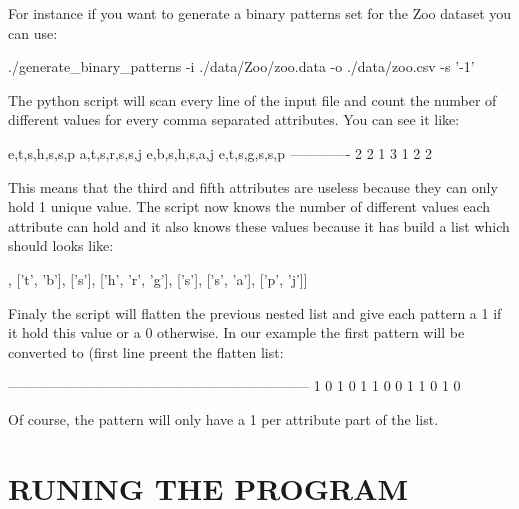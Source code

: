 For instance if you want to generate a binary patterns set for the Zoo dataset you can use\-: 
\begin{DoxyCode}
./generate\_binary\_patterns -i ./data/Zoo/zoo.data -o ./data/zoo.csv -s \textcolor{stringliteral}{'-1'}
\end{DoxyCode}


The python script will scan every line of the input file and count the number of different values for every comma separated attributes. You can see it like\-: 
\begin{DoxyCode}
e,t,s,h,s,s,p
a,t,s,r,s,s,j
e,b,s,h,s,a,j
e,t,s,g,s,s,p
-------------
2 2 1 3 1 2 2
\end{DoxyCode}


This means that the third and fifth attributes are useless because they can only hold 1 unique value. The script now knows the number of different values each attribute can hold and it also knows these values because it has build a list which should looks like\-: 
\begin{DoxyCode}
[[\textcolor{charliteral}{'e'}, \textcolor{charliteral}{'a'}],
 [\textcolor{charliteral}{'t'}, \textcolor{charliteral}{'b'}],
 [\textcolor{charliteral}{'s'}],
 [\textcolor{charliteral}{'h'}, \textcolor{charliteral}{'r'}, \textcolor{charliteral}{'g'}],
 [\textcolor{charliteral}{'s'}],
 [\textcolor{charliteral}{'s'}, \textcolor{charliteral}{'a'}],
 [\textcolor{charliteral}{'p'}, \textcolor{charliteral}{'j'}]]
\end{DoxyCode}


Finaly the script will flatten the previous nested list and give each pattern a 1 if it hold this value or a 0 otherwise. In our example the first pattern will be converted to (first line preent the flatten list\-: 
\begin{DoxyCode}
[\textcolor{charliteral}{'e'}, \textcolor{charliteral}{'a'}, \textcolor{charliteral}{'t'}, \textcolor{charliteral}{'b'}, \textcolor{charliteral}{'s'}, \textcolor{charliteral}{'h'}, \textcolor{charliteral}{'r'}, \textcolor{charliteral}{'g'}, \textcolor{charliteral}{'s'}, \textcolor{charliteral}{'s'}, \textcolor{charliteral}{'a'}, \textcolor{charliteral}{'p'}, \textcolor{charliteral}{'j'}]
-----------------------------------------------------------------
  1    0    1    0    1    1    0    0    1    1    0    1    0
\end{DoxyCode}


Of course, the pattern will only have a 1 per attribute part of the list.

\section*{R\-U\-N\-I\-N\-G T\-H\-E P\-R\-O\-G\-R\-A\-M }


